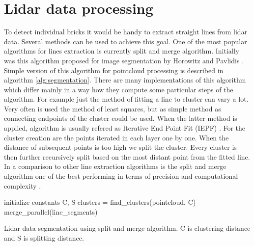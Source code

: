 \section{Lidar data processing}

To detect individual bricks it would be handy to extract straight lines from lidar data. Several methods can be used to achieve this goal. One of the most popular algorithms for lines extraction is currently split and merge algorithm. Initially was this algorithm proposed for image segmentation by Horowitz and Pavlidis \cite{horowitz1974}. Simple version of this algorithm for pointcloud processing is described in algorithm \ref{alg:segmentation}. There are many implementations of this algorithm which differ mainly in a way how they compute some particular steps of the algorithm. For example just the method of fitting a line to cluster can vary a lot. Very often is used the method of least squares, but as simple method as connecting endpoints of the cluster could be used. When the latter method is applied, algorithm is usually refered as Iterative End Point Fit (IEPF) \cite{siadat1997}. For the cluster creation are the points iterated in each layer one by one. When the distance of subsequent points is too high we split the cluster. Every cluster is then further recursively split based on the most distant point from the fitted line. In a comparison to other line extraction algorithms is the split and merge algorithm one of the best performing in terms of precision and computational complexity \cite{nguyen2006}.
\begin{algorithm}[]
initialize constants C, S\;
  clusters = find\_clusters(pointcloud, C)\;
merge\_parallel(line\_segments)\;
 
 \caption{Lidar data segmentation using split and merge algorithm. C is clustering distance and S is splitting distance.}
 \label{alg:segmentation}
\end{algorithm}


